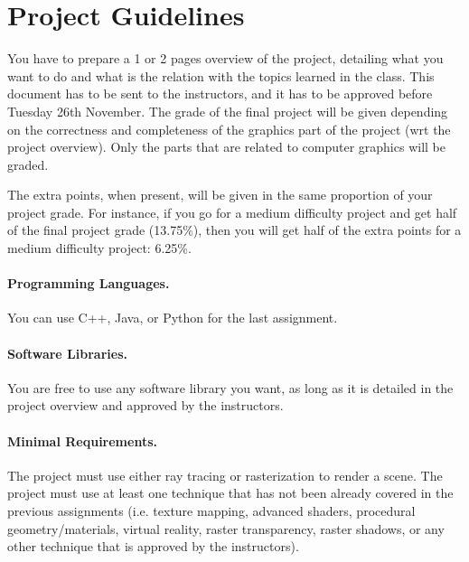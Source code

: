 \documentclass[11pt]{article}
\begin{document}
\section{Project Guidelines}

You have to prepare a 1 or 2 pages overview of the project, detailing what you want to do and what is the relation with the topics learned in the class. This document has to be sent to the instructors, and it has to be approved before Tuesday 26th November. The grade of the final project will be given depending on the correctness and completeness of the graphics part of the project (wrt the project overview). Only the parts that are related to computer graphics will be graded. 

The extra points, when present, will be given in the same proportion of your project grade. For instance, if you go for a medium difficulty project and get half of the final project grade (13.75\%), then you will get half of the extra points for a medium difficulty project: 6.25\%.

\paragraph{Programming Languages.} You can use C++, Java, or Python for the last assignment.


\paragraph{Software Libraries.} You are free to use any software library you want, as long as it is detailed in the project overview and approved by the instructors.

\paragraph{Minimal Requirements.} The project must use either ray tracing or rasterization to render a scene. The project must use at least one technique that has not been already covered in the previous assignments (i.e. texture mapping, advanced shaders, procedural geometry/materials, virtual reality, raster transparency, raster shadows, or any other technique that is approved by the instructors).
\end{document}

